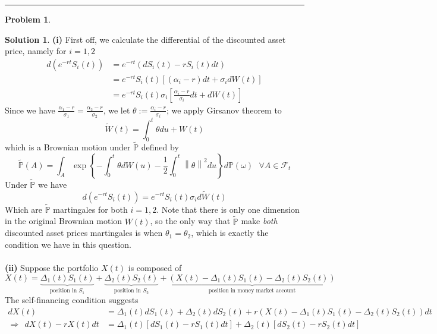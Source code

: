 \documentclass[a4paper, 10pt]{article}
\theoremstyle{definition}
\newtheorem{problem}{Problem}
\theoremstyle{hSol}
\newtheorem*{solution}{Solution}
\begin{document}
\noindent\rule{16cm}{0.4pt}
\begin{problem} 
\end{problem}
\begin{solution} \textbf{(i)} First off, we calculate the differential of the discounted asset price, namely for $i=1,2$
\begin{equation}
	\begin{split}
		d(e^{-rt} S_i(t)) &= e^{-rt}(dS_i(t) -rS_i(t)  dt) \\
		&= e^{-rt}S_i(t)\left[(\alpha_i - r)dt + \sigma_i dW(t)\right] \\
		&= e^{-rt}S_i(t)\sigma_i\left[\frac{\alpha_i - r}{\sigma_i}dt + dW(t)\right] 
	\end{split}
\end{equation}
Since we have $\frac{\alpha_1 - r}{\sigma_1}=\frac{\alpha_2 - r}{\sigma_2}$, we let $\theta:=\frac{\alpha_i - r}{\sigma_i}$; we apply Girsanov theorem to 
$$
\widetilde{W}(t) = \int_0^t \theta du + W(t)
$$
which is a Brownian motion under $\widetilde{\mathbb{P}}$ defined by
$$
\widetilde{\mathbb{P}}(A) = \int_A \exp\left\{-\int_0^t \theta dW(u)-\frac{1}{2}\int_0^t \left\lVert \theta \right\rVert^2 du \right\} d \mathbb{P}(\omega)~~~\forall A \in \mathcal{F}_t
$$
Under $\widetilde{\mathbb{P}}$ we have
$$
d(e^{-rt} S_i(t)) = e^{-rt}S_i(t)\sigma_i d\widetilde{W}(t)
$$
Which are $\widetilde{\mathbb{P}}$ martingales for both $i=1,2$. Note that there is only one dimension in the original Brownian motion $W(t)$, so the only way that $\widetilde{\mathbb{P}}$ make \textit{both} discounted asset prices martingales is when $\theta_1 = \theta_2$, which is exactly the condition we have in this question.\\
~\\
\textbf{(ii)} Suppose the portfolio $X(t)$ is composed of
\begin{equation}
	X(t) = \underbrace{\Delta_1(t)S_1(t)}_{\text{position in }S_1} + \underbrace{\Delta_2(t)S_2(t)}_{\text{position in }S_2} + \underbrace{(X(t) - \Delta_1(t)S_1(t) - \Delta_2(t)S_2(t))}_{\text{position in money market account}}
\end{equation}
The self-financing condition suggests
\begin{equation}
	\begin{split}
		dX(t) &= \Delta_1(t)dS_1(t) + \Delta_2(t)dS_2(t) + r(X(t)-\Delta_1(t)S_1(t)-\Delta_2(t)S_2(t))dt \\
		\Rightarrow ~~ dX(t) - rX(t)dt &= \Delta_1(t)[dS_1(t)-rS_1(t)dt] + \Delta_2(t)[dS_2(t)-rS_2(t)dt]\\

\end{split}
\end{equation}
\end{solution}
\end{document}
